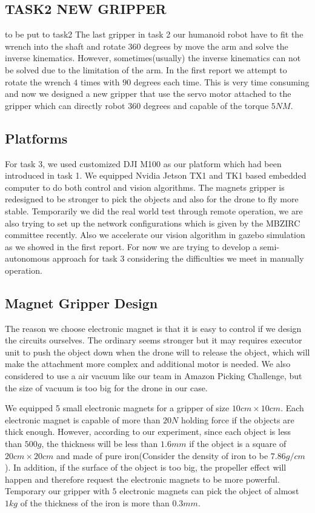 \documentclass{standalone}
\begin{document}
\subsection{TASK2 NEW GRIPPER}
to be put to task2
The last gripper in task 2 our humanoid robot have to fit the wrench into the shaft and rotate $360$ degrees by move the arm and solve the inverse kinematics. However, sometimes(usually) the inverse kinematics can not be solved due to the limitation of the arm. In the first report we attempt to rotate the wrench $4$ times with $90$ degrees each time. This is very time consuming and now we designed a new gripper that use the servo motor attached to the gripper which can directly robot $360$ degrees and capable of the torque $5NM$. 

\subsection{Platforms}
For task 3, we used customized DJI M100 as our platform which had been introduced in task 1. We equipped Nvidia Jetson TX1 and TK1 based embedded computer to do both control and vision algorithms. The magnets gripper is redesigned to be stronger to pick the objects and also for the drone to fly more stable. Temporarily we did the real world test through remote operation, we are also trying to set up the network configurations which is given by the MBZIRC committee recently. Also we accelerate our vision algorithm in gazebo simulation as we showed in the first report. For now we are trying to develop a semi-autonomous approach for task 3 considering the difficulties we meet in manually operation.

\subsection{Magnet Gripper Design}
The reason we choose electronic magnet is that it is easy to control if we design the circuits ourselves. The ordinary seems stronger but it may requires executor unit to push the object down when the drone will to release the object, which will make the attachment more complex and additional motor is needed. We also considered to use a air vacuum like our team in Amazon Picking Challenge, but the size of vacuum is too big for the drone in our case. 

We equipped 5 small electronic magnets for a gripper of size $10cm \times 10cm$. Each electronic magnet is capable of more than $20N$ holding force if the objects are thick enough. However, according to our experiment, since each object is less than $500g$, the thickness will be less than $1.6mm$ if the object is a square of $20cm \times 20cm$ and made of pure iron(Consider the density of iron to be $7.86g/cm$). In addition, if the surface of the object is too big, the propeller effect will happen and therefore request the electronic magnets to be more powerful. Temporary our gripper with $5$ electronic magnets can pick the object of almost $1kg$ of the thickness of the iron is more than $0.3mm$. 
\end{document}
